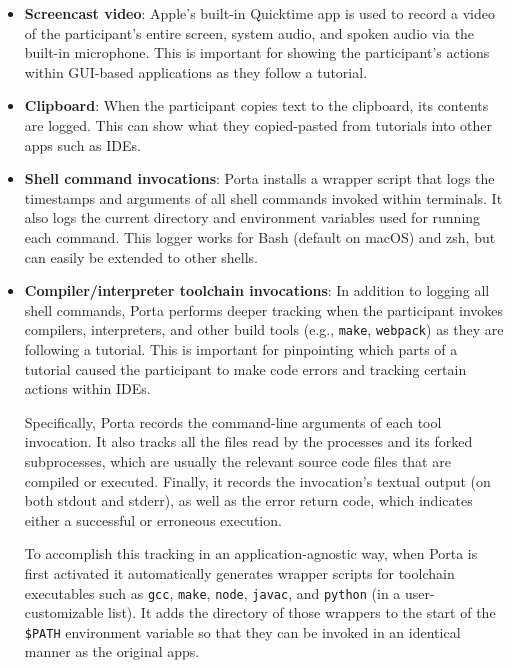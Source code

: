 \begin{itemize}

    \item \textbf{Screencast video}: Apple's built-in Quicktime app is
    used to record a video of the participant's entire screen, system
    audio, and spoken audio via the built-in microphone. This is
    important for showing the participant's actions within GUI-based
    applications as they follow a tutorial.

    \item \textbf{Clipboard}: When the participant copies text to the
    clipboard, its contents are logged. This can show what they
    copied-pasted from tutorials into other apps such as IDEs.

    \item \textbf{Shell command invocations}: Porta installs a wrapper
    script that logs the timestamps and arguments of all shell commands
    invoked within terminals. It also logs the current directory and
    environment variables used for running each command. This logger
    works for Bash (default on macOS) and zsh, but can easily be
    extended to other shells.

    \item \textbf{Compiler/interpreter toolchain invocations}: In
    addition to logging all shell commands, Porta performs deeper tracking
    when the participant invokes compilers, interpreters, and other
    build tools (e.g., \texttt{make}, \texttt{webpack}) as they are
    following a tutorial. This is important for pinpointing which
    parts of a tutorial caused the participant to make code errors and
    tracking certain actions within IDEs.

    Specifically, Porta records the command-line arguments of each tool
    invocation. It also tracks all the files read by the processes and
    its forked subprocesses, which are usually the relevant source code
    files that are compiled or executed. Finally, it records the
    invocation's textual output (on both stdout and stderr), as well as
    the error return code, which indicates either a successful or
    erroneous execution.

    To accomplish this tracking in an application-agnostic way, when
    Porta is first activated it automatically generates wrapper scripts for toolchain
    executables such as \texttt{gcc}, \texttt{make}, \texttt{node},
    \texttt{javac}, and \texttt{python} (in a user-customizable list).
    It adds the directory of those wrappers to the start of the
    \texttt{\$PATH} environment variable so that they can be invoked
    in an identical manner as the original apps.


\end{itemize}

